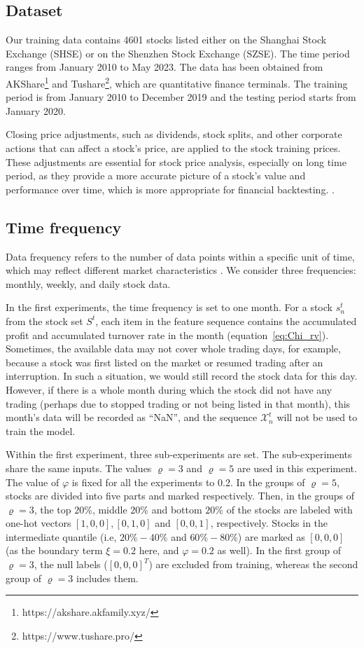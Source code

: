 \documentclass[preprint,12pt]{elsarticle}
\begin{document}
\subsection{Dataset}
Our training data contains 4601 stocks
listed either on the Shanghai Stock Exchange (SHSE) or on the Shenzhen Stock Exchange (SZSE). The time period ranges from January 2010 to May 2023. The data has been obtained from AKShare\footnote{https://akshare.akfamily.xyz/} and Tushare\footnote{https://www.tushare.pro/}, which are quantitative finance terminals. The training period is from January 2010 to December 2019 and the testing period starts from January 2020.

Closing price adjustments, such as dividends, stock splits, and other corporate actions that can affect a stock's price, are applied to the stock training prices. These adjustments are essential for stock price analysis, especially on long time period, as they provide a more accurate picture of a stock's value and performance over time, which is more appropriate for financial backtesting.
\citep{diamond1971model,wei2022deep}. 




\subsection{Time frequency}
\label{timestamp}
Data frequency refers to the number of data points within a specific unit of time, which may reflect different market characteristics \citep{de2018advances}. We consider three frequencies: monthly, weekly, and daily stock data. 

In the first experiments, the time frequency is set to one month. For a stock $s^t_n$ from the stock set $S^{t}$, each item in the feature sequence contains the accumulated profit and accumulated turnover rate in the month (equation~\eqref{eq:Chi_rv}). Sometimes, the available data may not cover whole trading days, for example, because a stock was first listed on the market or resumed trading after an interruption. In such a  situation, we would still record the stock data for this day. However, if there is a whole month during which the stock did not have any trading (perhaps due to stopped trading or not being listed in that month), this month's data will be recorded as ``NaN'', and the sequence $\mathcal{X}^{t} _{n}$ will not be used to train the model.

Within the first experiment, three sub-experiments are set. The sub-experiments share the same inputs. The values $\varrho = 3$ and $\varrho =5$ are used in this experiment. The value of $\varphi$ is fixed for all the experiments to 0.2. In the groups of $\varrho =5$, stocks are divided into five parts and marked respectively. Then, in the groups of $\varrho=3$, the top $20\%$, middle $20\%$ and bottom $20\%$ of the stocks are labeled with one-hot vectors $[1,0,0], [0,1,0]$ and $[0,0,1]$, respectively. Stocks in the intermediate quantile (i.e, $20\%-40\%$ and $60\%-80\%$) are marked as $[0,0,0]$ (as the boundary term $\xi = 0.2$ here, and $\varphi = 0.2$ as well). In the first group of $\varrho=3$, the null labels ($[0,0,0]^T$) are excluded from training, whereas the second group of $\varrho=3$ includes them.
\end{document}
